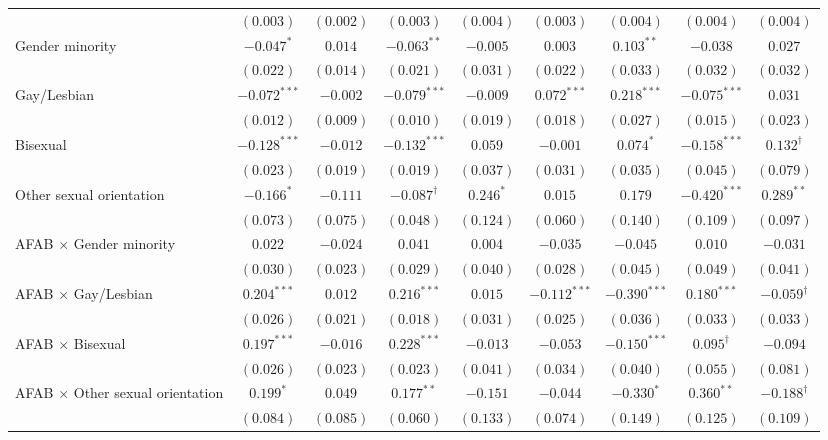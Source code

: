 \begin{table}[htpb]
{\begin{tabular}{l c c c c c c c c}
 & $(0.003)$ & $(0.002)$ & $(0.003)$ & $(0.004)$ & $(0.003)$ & $(0.004)$ & $(0.004)$ & $(0.004)$ \\
Gender minority & $-0.047^{*}$ & $0.014$ & $-0.063^{**}$ & $-0.005$ & $0.003$ & $0.103^{**}$ & $-0.038$ & $0.027$ \\
 & $(0.022)$ & $(0.014)$ & $(0.021)$ & $(0.031)$ & $(0.022)$ & $(0.033)$ & $(0.032)$ & $(0.032)$ \\
Gay/Lesbian & $-0.072^{***}$ & $-0.002$ & $-0.079^{***}$ & $-0.009$ & $0.072^{***}$ & $0.218^{***}$ & $-0.075^{***}$ & $0.031$ \\
 & $(0.012)$ & $(0.009)$ & $(0.010)$ & $(0.019)$ & $(0.018)$ & $(0.027)$ & $(0.015)$ & $(0.023)$ \\
Bisexual & $-0.128^{***}$ & $-0.012$ & $-0.132^{***}$ & $0.059$ & $-0.001$ & $0.074^{*}$ & $-0.158^{***}$ & $0.132^{\dagger}$ \\
 & $(0.023)$ & $(0.019)$ & $(0.019)$ & $(0.037)$ & $(0.031)$ & $(0.035)$ & $(0.045)$ & $(0.079)$ \\
Other sexual orientation & $-0.166^{*}$ & $-0.111$ & $-0.087^{\dagger}$ & $0.246^{*}$ & $0.015$ & $0.179$ & $-0.420^{***}$ & $0.289^{**}$ \\
 & $(0.073)$ & $(0.075)$ & $(0.048)$ & $(0.124)$ & $(0.060)$ & $(0.140)$ & $(0.109)$ & $(0.097)$ \\
AFAB $\times$ Gender minority & $0.022$ & $-0.024$ & $0.041$ & $0.004$ & $-0.035$ & $-0.045$ & $0.010$ & $-0.031$ \\
 & $(0.030)$ & $(0.023)$ & $(0.029)$ & $(0.040)$ & $(0.028)$ & $(0.045)$ & $(0.049)$ & $(0.041)$ \\
AFAB $\times$ Gay/Lesbian & $0.204^{***}$ & $0.012$ & $0.216^{***}$ & $0.015$ & $-0.112^{***}$ & $-0.390^{***}$ & $0.180^{***}$ & $-0.059^{\dagger}$ \\
 & $(0.026)$ & $(0.021)$ & $(0.018)$ & $(0.031)$ & $(0.025)$ & $(0.036)$ & $(0.033)$ & $(0.033)$ \\
AFAB $\times$ Bisexual & $0.197^{***}$ & $-0.016$ & $0.228^{***}$ & $-0.013$ & $-0.053$ & $-0.150^{***}$ & $0.095^{\dagger}$ & $-0.094$ \\
 & $(0.026)$ & $(0.023)$ & $(0.023)$ & $(0.041)$ & $(0.034)$ & $(0.040)$ & $(0.055)$ & $(0.081)$ \\
AFAB $\times$ Other sexual orientation & $0.199^{*}$ & $0.049$ & $0.177^{**}$ & $-0.151$ & $-0.044$ & $-0.330^{*}$ & $0.360^{**}$ & $-0.188^{\dagger}$ \\
 & $(0.084)$ & $(0.085)$ & $(0.060)$ & $(0.133)$ & $(0.074)$ & $(0.149)$ & $(0.125)$ & $(0.109)$ \\

\end{tabular}}
\end{table}
